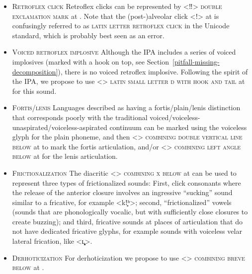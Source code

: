 \begin{itemize}
  
\item \textsc{Retroflex click} \newline
      Retroflex clicks can be represented by <‼> \textsc{double exclamation
      mark} at . Note that the (post-)alveolar click <ǃ> at 
      is confusingly referred to as \textsc{latin letter retroflex click} in the
      Unicode standard, which is probably best seen as an error.
\item \textsc{Voiced retroflex implosive} \newline 
      Although the IPA includes a
      series of voiced implosives (marked with a hook on top, see
      Section~\ref{pitfall-missing-decomposition}), there is no voiced retroflex
      implosive. Following the spirit of the IPA, we propose to use <>
      \textsc{latin small letter d with hook and tail} at  for this
      sound.
\item \textsc{Fortis/lenis} \newline
      Languages described as having a fortis/plain/lenis distinction that
      corresponds poorly with the traditional
      voiced/voiceless-unaspirated/voiceless-aspirated continuum can be marked
      using the voiceless glyph for the plain phoneme, and then 
      <> \textsc{combining double vertical line below} at
       to mark the fortis articulation, and/or <>
      \textsc{combining left angle below} at  for the lenis
      articulation.
\item \textsc{Frictionalization} \newline 
      The diacritic <>
      \textsc{combining x below} at  can be used to represent three
      types of frictionalized sounds: First, click consonants where the release
      of the anterior closure involves an ingressive ``sucking'' sound similar
      to a fricative, for example <kǃ͓ʰ>; second, ``frictionalized'' vowels
      (sounds that are phonologically vocalic, but with sufficiently close
      closures to create buzzing); and third, fricative sounds at places of
      articulation that do not have dedicated fricative glyphs, for example
      sounds with voiceless velar lateral frication, like <ʟ̥͓>.
\item \textsc{Derhoticization} \newline 
      For derhoticization we propose to use
      <> \textsc{combining breve below} at . 

\end{itemize}
